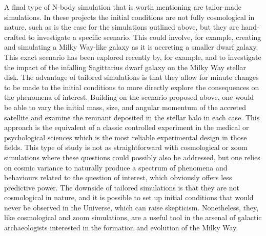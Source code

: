 A final type of N-body simulation that is worth mentioning are tailor-made simulations. In these projects the initial conditions are not fully cosmological in nature, such as is the case for the simulations outlined above, but they are hand-crafted to investigate a specific scenario. This could involve, for example, creating and simulating a Milky Way-like galaxy as it is accreting a smaller dwarf galaxy. This exact scenario has been explored recently by, for example, \textcite{laporte19} and \textcite{bennett22} to investigate the impact of the infalling Sagittarius dwarf galaxy on the Milky Way stellar disk. The advantage of tailored simulations is that they allow for minute changes to be made to the initial conditions to more directly explore the consequences on the phenomena of interest. Building on the scenario proposed above, one would be able to vary the initial mass, size, and angular momentum of the accreted satellite and examine the remnant deposited in the stellar halo in each case. This approach is the equivalent of a classic controlled experiment in the medical or psychological sciences which is the most reliable experimental design in those fields. This type of study is not as straightforward with cosmological or zoom simulations where these questions could possibly also be addressed, but one relies on cosmic variance to naturally produce a spectrum of phenomena and behaviours related to the question of interest, which obviously offers less predictive power. The downside of tailored simulations is that they are not cosmological in nature, and it is possible to set up initial conditions that would never be observed in the Universe, which can raise skepticism. Nonetheless, they, like cosmological and zoom simulations, are a useful tool in the arsenal of galactic archaeologists interested in the formation and evolution of the Milky Way.